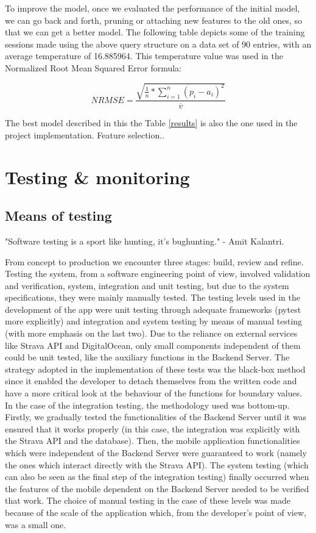 To improve the model, once we evaluated the performance of the initial model, we can go back and forth, pruning or attaching new features to the old ones, so that we can get a better model. The following table depicts some of the training sessions made using the above query structure on a data set of 90 entries, with an average temperature of 16.885964. This temperature value was used in the Normalized Root Mean Squared Error formula:

\begin{equation}
NRMSE = \frac{\sqrt{\frac{1}{n} * \sum_{i=1}^{n} (p_i - a_i)^2}}{\overline{v}}  
\end{equation}

The best model described in this the Table \ref{results} is also the one used in the project implementation. Feature selection..

\section{Testing \& monitoring}

\subsection*{Means of testing}

"Software testing is a sport like hunting, it's bughunting." - Amit Kalantri.

From concept to production we encounter three stages: build, review and refine. Testing the system, from a software engineering point of view, involved validation and verification, system, integration and unit testing, but due to the system specifications, they were mainly manually tested. 
The testing levels used in the development of the app were unit testing through adequate frameworks (pytest more explicitly) and integration and system testing by means of manual testing (with more emphasis on the last two). Due to the reliance on external services like Strava API and DigitalOcean, only small components independent of them could be unit tested, like the auxiliary functions in the Backend Server. The strategy adopted in the implementation of these tests was the black-box method since it enabled the developer to detach themselves from the written code and have a more critical look at the behaviour of the functions for boundary values. In the case of the integration testing, the methodology used was bottom-up. Firstly, we gradually tested the functionalities of the Backend Server until it was ensured that it works properly (in this case, the integration was explicitly with the Strava API and the database). Then, the mobile application functionalities which were independent of the Backend Server were guaranteed to work (namely the ones which interact directly with the Strava API). The system testing (which can also be seen as the final step of the integration testing) finally occurred when the features of the mobile dependent on the Backend Server needed to be verified that work. The choice of manual testing in the case of these levels was made because of the scale of the application which, from the developer's point of view, was a small one.

